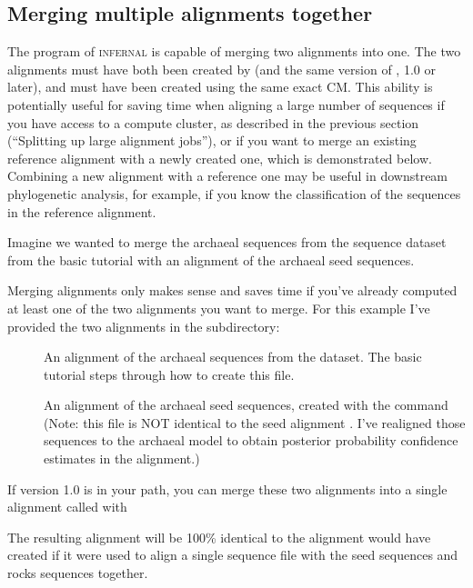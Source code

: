 \subsection{Merging multiple alignments together}

The  program of \textsc{infernal} is capable of merging
two alignments into one. The two alignments must have both been
created by  (and the same version of , 1.0
or later), and must have been created using the same exact CM. This
ability is potentially useful for saving time when aligning a large
number of sequences if you have access to a compute cluster, as
described in the previous section (``Splitting up large alignment
jobs''), or if you want to merge an existing reference alignment with
a newly created one, which is demonstrated below. Combining a new
alignment with a reference one may be useful in downstream
phylogenetic analysis, for example, if you know the classification of
the sequences in the reference alignment.

Imagine we wanted to merge the archaeal sequences from the
 sequence dataset from the basic tutorial with 
an alignment of the archaeal seed sequences. 

Merging alignments only makes sense and saves time if you've already
computed at least one of the two alignments you want to merge. For
this example I've provided the two alignments in the 
subdirectory:

\begin{description}
\item[]
  An alignment of the archaeal sequences from the 
  dataset. The basic tutorial steps through how to create this file.

\item[]
  An alignment of the archaeal seed sequences, created with the
  command 
  (Note: this file is NOT identical to the seed alignment
  . I've realigned those sequences to the
  archaeal model to obtain posterior probability confidence estimates
  in the alignment.) 
\end{description}

If  version 1.0 is in your path, you 
can merge these two alignments into a single alignment called
 with


The resulting alignment will be 100\% identical to the alignment
 would have created if it were used to align a single
sequence file with the seed sequences and rocks sequences together.

